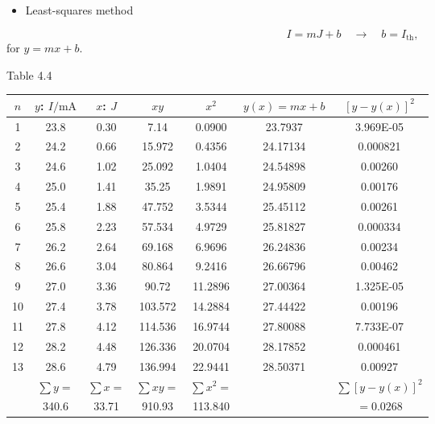 \begin{itemize}
\item Least-squares method
\end{itemize}

\[
I=mJ+b\quad\longrightarrow\quad b=I_{\mathrm{th}},
\]
for $y=mx+b$.

\begin{center}
{\small Table 4.4}\\[3pt]
{\footnotesize
\renewcommand{\arraystretch}{1.12}
\begin{tabular}{|c|c|c|c|c|c|c|}
\hline
$n$ & $y$: $I/\mathrm{mA}$ & $x$: $J$ & $xy$ & $x^{2}$ & $y(x)=mx+b$ & $[y-y(x)]^{2}$\\
\hline
1 & 23.8 & 0.30 & 7.14 & 0.0900 & 23.7937 & 3.969E-05\\
\hline
2 & 24.2 & 0.66 & 15.972 & 0.4356 & 24.17134 & 0.000821\\
\hline
3 & 24.6 & 1.02 & 25.092 & 1.0404 & 24.54898 & 0.00260\\
\hline
4 & 25.0 & 1.41 & 35.25 & 1.9891 & 24.95809 & 0.00176\\
\hline
5 & 25.4 & 1.88 & 47.752 & 3.5344 & 25.45112 & 0.00261\\
\hline
6 & 25.8 & 2.23 & 57.534 & 4.9729 & 25.81827 & 0.000334\\
\hline
7 & 26.2 & 2.64 & 69.168 & 6.9696 & 26.24836 & 0.00234\\
\hline
8 & 26.6 & 3.04 & 80.864 & 9.2416 & 26.66796 & 0.00462\\
\hline
9 & 27.0 & 3.36 & 90.72 & 11.2896 & 27.00364 & 1.325E-05\\
\hline
10 & 27.4 & 3.78 & 103.572 & 14.2884 & 27.44422 & 0.00196\\
\hline
11 & 27.8 & 4.12 & 114.536 & 16.9744 & 27.80088 & 7.733E-07\\
\hline
12 & 28.2 & 4.48 & 126.336 & 20.0704 & 28.17852 & 0.000461\\
\hline
13 & 28.6 & 4.79 & 136.994 & 22.9441 & 28.50371 & 0.00927\\
\hline
 & $\sum y=$ & $\sum x=$ & $\sum xy=$ & $\sum x^{2}=$ & & $\sum[y-y(x)]^{2}$\\
 & 340.6 & 33.71 & 910.93 & 113.840 & & $=0.0268$\\
\hline
\end{tabular}}
\end{center}


